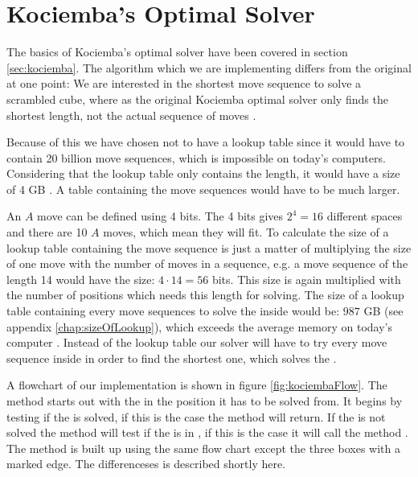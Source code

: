 \chapter{Kociemba's Optimal Solver}
\label{chap:kociembaImplement}
The basics of Kociemba's optimal solver have been covered in section \ref{sec:kociemba}. The algorithm which we are implementing differs from the original at one point:
We are interested in the shortest move sequence to solve a scrambled cube, where as the original Kociemba optimal solver only finds the shortest length, not the actual sequence of moves \cite{rokicki09}.

Because of this we have chosen not to have a lookup table since it would have to contain 20 billion move sequences, which is impossible on today's computers. Considering that the lookup table only contains the length, it would have a size of 4 GB \cite{cubeExplorer}. A table containing the move sequences would have to be much larger.

An $A$ move can be defined using 4 bits.
The 4 bits gives $2^4=16$ different spaces and there are 10 $A$ moves, which mean they will fit.
To calculate the size of a lookup table containing the move sequence is just a matter of multiplying the size of one move with the number of moves in a sequence, e.g. a move sequence of the length 14 would have the size: $4 \cdot 14 = 56$ bits.
This size is again multiplied with the number of positions which needs this length for solving.
The size of a lookup table containing every move sequences to solve the \rubik{} inside  would be: $987$ GB (see appendix \ref{chap:sizeOfLookup}), which exceeds the average memory on today's computer \cite{averageRAM} \cite{maxRAM2}.
Instead of the lookup table our solver will have to try every move sequence inside  in order to find the shortest one, which solves the \rubik{}.

A flowchart of our implementation is shown in figure \ref{fig:kociembaFlow}.
The method starts out with the \rubik{} in the position it has to be solved from.
It begins by testing if the \rubik{} is solved, if this is the case the method will return.
If the \rubik{} is not solved the method will test if the \rubik{} is in , if this is the case it will call the method .
The method  is built up using the same flow chart except the three boxes with a marked edge.
The differenceses is described shortly here.

